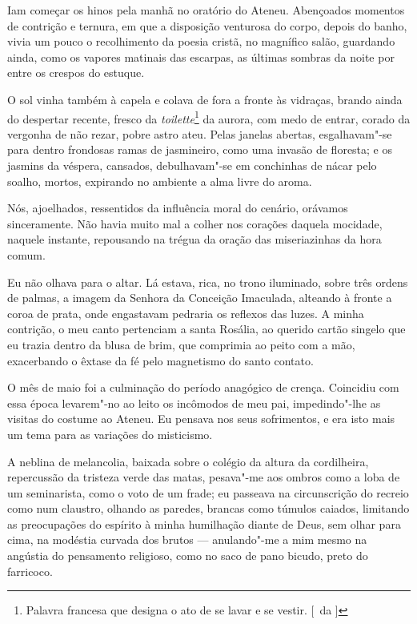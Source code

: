 Iam começar os hinos pela manhã no oratório do Ateneu.
Abençoados momentos de contrição e ternura, em que a disposição
venturosa do corpo, depois do banho, vivia um pouco o recolhimento da
poesia cristã, no magnífico salão, guardando ainda, como os vapores
matinais das escarpas, as últimas sombras da noite por entre os crespos
do estuque. 

O sol vinha também à capela e colava de fora a fronte às
vidraças, brando ainda do despertar recente, fresco da \textit{toilette}\footnote{ Palavra francesa 
que designa o ato de se lavar e se vestir. [~da ]} da
aurora, com medo de entrar, corado da vergonha de não rezar, pobre
astro ateu. Pelas janelas abertas, esgalhavam"-se para dentro
frondosas ramas de jasmineiro, como uma invasão de floresta; e os
jasmins da véspera, cansados, debulhavam"-se em conchinhas de nácar
pelo soalho, mortos, expirando no ambiente a alma livre do aroma. 


Nós, ajoelhados, ressentidos da influência moral do cenário, orávamos
sinceramente. Não havia muito mal a colher nos corações daquela
mocidade, naquele instante, repousando na trégua da oração das
miseriazinhas da hora comum. 

Eu não olhava para o altar. Lá estava,
rica, no trono iluminado, sobre três ordens de palmas, a imagem da
Senhora da Conceição Imaculada, alteando à fronte a coroa de prata,
onde engastavam pedraria os reflexos das luzes. A minha contrição, o
meu canto pertenciam a santa Rosália, ao querido cartão singelo que eu
trazia dentro da blusa de brim, que comprimia ao peito com a mão,
exacerbando o êxtase da fé pelo magnetismo do santo contato. 

O mês de maio foi a culminação do período anagógico de crença. Coincidiu com
essa época levarem"-no ao leito os incômodos de meu pai,
impedindo"-lhe as visitas do costume ao Ateneu. Eu pensava nos seus
sofrimentos, e era isto mais um tema para as variações do misticismo.

A neblina de melancolia, baixada sobre o colégio da altura da
cordilheira, repercussão da tristeza verde das matas, pesava"-me aos
ombros como a loba de um seminarista, como o voto de um frade; eu
passeava na circunscrição do recreio como num claustro, olhando as
paredes, brancas como túmulos caiados, limitando as preocupações do
espírito à minha humilhação diante de Deus, sem olhar para cima, na
modéstia curvada dos brutos --- anulando"-me a mim mesmo na angústia
do pensamento religioso, como no saco de pano bicudo, preto do farricoco. 

